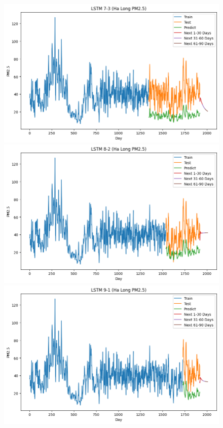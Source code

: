 \begin{figure}[H]
{\begin{adjustbox}{minipage=0.48\textwidth}
            \centering
            \begin{minipage}{0.3\textwidth}
                \centering
                \includegraphics[width=\textwidth]{img/final/LSTM/90D/LSTM_7_3_HL.png}\\
                \includegraphics[width=\textwidth]{img/final/LSTM/90D/LSTM_8_2_HL.png}\\
                \includegraphics[width=\textwidth]{img/final/LSTM/90D/LSTM_9_1_HL.png}

\end{minipage}
\end{adjustbox}}
\end{figure}

